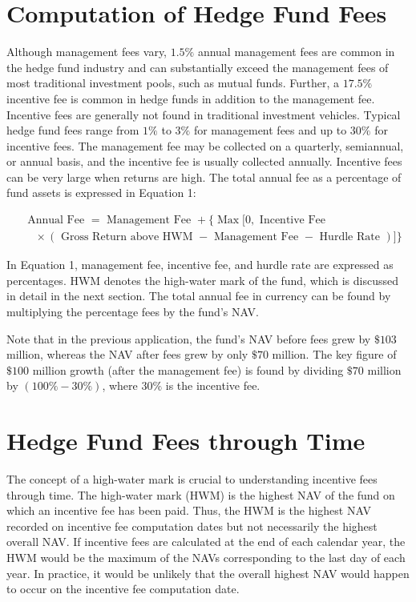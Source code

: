 \documentclass[11pt]{article}
\begin{document}
\section*{Computation of Hedge Fund Fees}
Although management fees vary, $1.5 \%$ annual management fees are common in the hedge fund industry and can substantially exceed the management fees of most traditional investment pools, such as mutual funds. Further, a $17.5 \%$ incentive fee is common in hedge funds in addition to the management fee. Incentive fees are generally not found in traditional investment vehicles. Typical hedge fund fees range from $1 \%$ to $3 \%$ for management fees and up to $30 \%$ for incentive fees. The management fee may be collected on a quarterly, semiannual, or annual basis, and the incentive fee is usually collected annually. Incentive fees can be very large when returns are high. The total annual fee as a percentage of fund assets is expressed in Equation 1:


\begin{align*}
& \text { Annual Fee }=\text { Management Fee }+\{\operatorname{Max}[0, \text { Incentive Fee }  \tag{1}\\
& \quad \times(\text { Gross Return above HWM }- \text { Management Fee }- \text { Hurdle Rate })]\}
\end{align*}


In Equation 1, management fee, incentive fee, and hurdle rate are expressed as percentages. HWM denotes the high-water mark of the fund, which is discussed in detail in the next section. The total annual fee in currency can be found by multiplying the percentage fees by the fund's NAV.

Note that in the previous application, the fund's NAV before fees grew by $\$ 103$ million, whereas the NAV after fees grew by only $\$ 70$ million. The key figure of $\$ 100$ million growth (after the management fee) is found by dividing $\$ 70$ million by $(100 \%-30 \%)$, where $30 \%$ is the incentive fee.

\section*{Hedge Fund Fees through Time}
The concept of a high-water mark is crucial to understanding incentive fees through time. The high-water mark (HWM) is the highest NAV of the fund on which an incentive fee has been paid. Thus, the HWM is the highest NAV recorded on incentive fee computation dates but not necessarily the highest overall NAV. If incentive fees are calculated at the end of each calendar year, the HWM would be the maximum of the NAVs corresponding to the last day of each year. In practice, it would be unlikely that the overall highest NAV would happen to occur on the incentive fee computation date.
\end{document}
